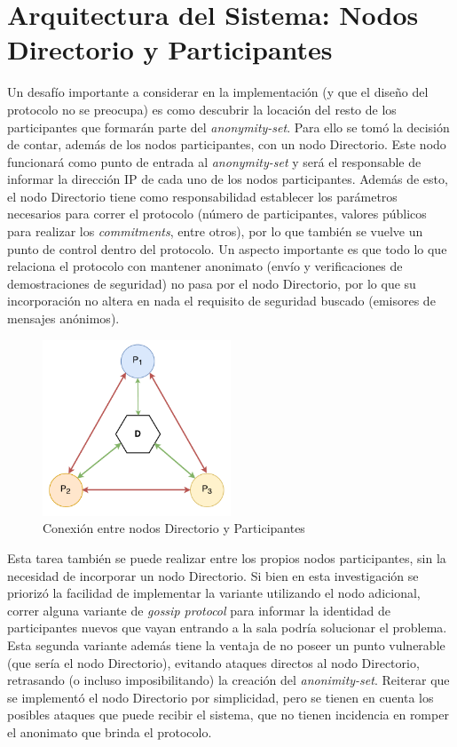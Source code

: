 \section{Arquitectura del Sistema: Nodos Directorio y Participantes}

Un desafío importante a considerar en la implementación (y que el diseño del 
protocolo no se preocupa) es como descubrir la locación del resto de los 
participantes que formarán parte del \emph{anonymity-set}. Para ello se tomó 
la decisión de contar, además de los nodos participantes, con un nodo 
Directorio. Este nodo funcionará como punto de entrada al \emph{anonymity-set} 
y será el responsable de informar la dirección IP de cada uno de los nodos 
participantes. Además de esto, el nodo Directorio tiene como responsabilidad 
establecer los parámetros necesarios para correr el protocolo (número de 
participantes, valores públicos para realizar los \emph{commitments}, entre 
otros), por lo que también se vuelve un punto de control dentro del protocolo. 
Un aspecto importante es que todo lo que relaciona el protocolo con mantener 
anonimato (envío y verificaciones de demostraciones de seguridad) no pasa por 
el nodo Directorio, por lo que su incorporación no altera en nada el requisito 
de seguridad buscado (emisores de mensajes anónimos).

\begin{figure}
  \centering
    \includegraphics[width=0.5\textwidth]{imagenes/architecture.pdf}
  \caption{Conexión entre nodos Directorio y Participantes}
\end{figure}

Esta tarea también se puede realizar entre los propios nodos participantes, 
sin la necesidad de incorporar un nodo Directorio. Si bien en esta 
investigación se priorizó la facilidad de implementar la variante utilizando 
el nodo adicional, correr alguna variante de \emph{gossip protocol} para 
informar la identidad de participantes nuevos que vayan entrando a la sala 
podría solucionar el problema. Esta segunda variante además tiene la ventaja 
de no poseer un punto vulnerable (que sería el nodo Directorio), evitando 
ataques directos al nodo Directorio, retrasando (o incluso imposibilitando) la 
creación del \emph{anonimity-set}. Reiterar que se implementó el nodo 
Directorio por simplicidad, pero se tienen en cuenta los posibles ataques que 
puede recibir el sistema, que no tienen incidencia en romper el anonimato que 
brinda el protocolo.

